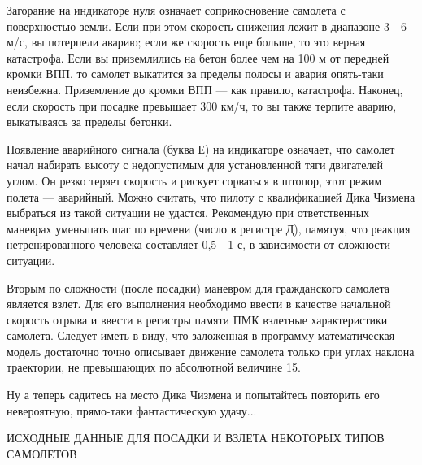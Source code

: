 \documentclass[11pt,a4paper,oneside]{article}
\begin{document}
Загорание на индикаторе нуля означает соприкосновение самолета с поверхностью земли. Если при этом скорость снижения лежит в диапазоне 3—6 м/с, вы потерпели аварию; если же скорость еще больше, то это верная катастрофа. Если вы приземлились на бетон более чем на 100 м от передней кромки ВПП, то самолет выкатится за пределы полосы и авария опять-таки неизбежна. Приземление до кромки ВПП — как правило, катастрофа. Наконец, если скорость при посадке превышает 300 км/ч, то вы также терпите аварию, выкатываясь за пределы бетонки.

Появление аварийного сигнала (буква Е) на индикаторе означает, что самолет начал набирать высоту с недопустимым для установленной тяги двигателей углом. Он резко теряет скорость и рискует сорваться в штопор, этот режим полета — аварийный. Можно считать, что пилоту с квалификацией Дика Чизмена выбраться из такой ситуации не удастся. Рекомендую при ответственных маневрах уменьшать шаг по времени (число в регистре Д), памятуя, что реакция нетренированного человека составляет 0,5—1 с, в зависимости от сложности ситуации.

Вторым по сложности (после посадки) маневром для гражданского самолета является взлет. Для его выполнения необходимо ввести в качестве начальной скорость отрыва и ввести в регистры памяти ПМК взлетные характеристики самолета. Следует иметь в виду, что заложенная в программу математическая модель достаточно точно описывает движение самолета только при углах наклона траектории, не превышающих по абсолютной величине 15\degree.

Ну а теперь садитесь на место Дика Чизмена и попытайтесь повторить его невероятную, прямо-таки фантастическую удачу...

ИСХОДНЫЕ ДАННЫЕ
ДЛЯ ПОСАДКИ И ВЗЛЕТА
НЕКОТОРЫХ ТИПОВ САМОЛЕТОВ
\end{document}
